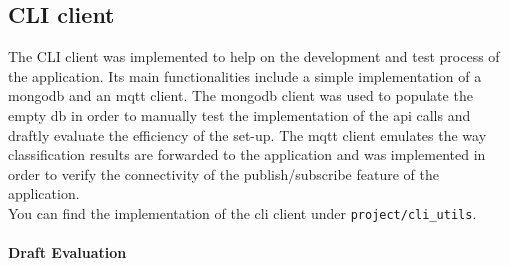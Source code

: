 \documentclass[a4paper,10pt]{article}
\begin{document}
\subsection{CLI client}
The CLI client was implemented to help on the development and test process of the application.
Its main functionalities include a simple implementation of a mongodb and an mqtt client. The
mongodb client was used to populate the empty db in order to manually test the implementation
of the api calls and draftly evaluate the efficiency of the set-up. The mqtt client emulates
the way classification results are forwarded to the application and was implemented in order
to verify the connectivity of the publish/subscribe feature of the application.
\\
You can find the implementation of the cli client under \texttt{project/cli\_utils}.
\paragraph{Draft Evaluation} \hspace{1pt} \\
\end{document}
